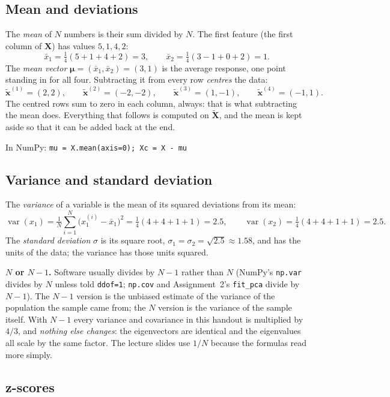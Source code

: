 \documentclass[11pt]{article}
\newcommand{\vx}{\bm{x}}
\newcommand{\vmu}{\bm{\mu}}
\newcommand{\mX}{\bm{X}}
\newcommand{\np}[1]{{\small\color{lightgray}In NumPy: \texttt{#1}}\par}
\begin{document}
\subsection{Mean and deviations}

The \emph{mean} of $N$ numbers is their sum divided by $N$. The first feature (the first
column of $\mX$) has values $5, 1, 4, 2$:
\[
\bar{x}_1 = \tfrac{1}{4}(5 + 1 + 4 + 2) = 3, \qquad
\bar{x}_2 = \tfrac{1}{4}(3 - 1 + 0 + 2) = 1 .
\]
The \emph{mean vector} $\vmu = (\bar{x}_1, \bar{x}_2) = (3, 1)$ is the average response,
one point standing in for all four. Subtracting it from every row \emph{centres} the data:
\[
\tilde{\vx}^{(1)} = (2, 2),\qquad \tilde{\vx}^{(2)} = (-2, -2),\qquad
\tilde{\vx}^{(3)} = (1, -1),\qquad \tilde{\vx}^{(4)} = (-1, 1).
\]
The centred rows sum to zero in each column, always: that is what subtracting the mean
does. Everything that follows is computed on $\tilde{\mX}$, and the mean is kept aside so
that it can be added back at the end.

\np{mu = X.mean(axis=0); Xc = X - mu}

\subsection{Variance and standard deviation}

The \emph{variance} of a variable is the mean of its squared deviations from its mean:
\[
\operatorname{var}(x_1) = \tfrac{1}{N}\sum_{i=1}^{N}\big(x^{(i)}_1 - \bar{x}_1\big)^2
= \tfrac{1}{4}(4 + 4 + 1 + 1) = 2.5, \qquad
\operatorname{var}(x_2) = \tfrac{1}{4}(4 + 4 + 1 + 1) = 2.5 .
\]
The \emph{standard deviation} $\sigma$ is its square root, $\sigma_1 = \sigma_2 =
\sqrt{2.5} \approx 1.58$, and has the units of the data; the variance has those units
squared.

\textbf{$N$ or $N-1$.} Software usually divides by $N - 1$ rather than $N$ (NumPy's
\texttt{np.var} divides by $N$ unless told \texttt{ddof=1}; \texttt{np.cov} and
Assignment~2's \texttt{fit\_pca} divide by $N - 1$). The $N - 1$ version is the unbiased
estimate of the variance of the population the sample came from; the $N$ version is the
variance of the sample itself. With $N - 1$ every variance and covariance in this handout
is multiplied by $4/3$, and \emph{nothing else changes}: the eigenvectors are identical and
the eigenvalues all scale by the same factor. The lecture slides use $1/N$ because the
formulas read more simply.

\subsection{z-scores}
\end{document}
